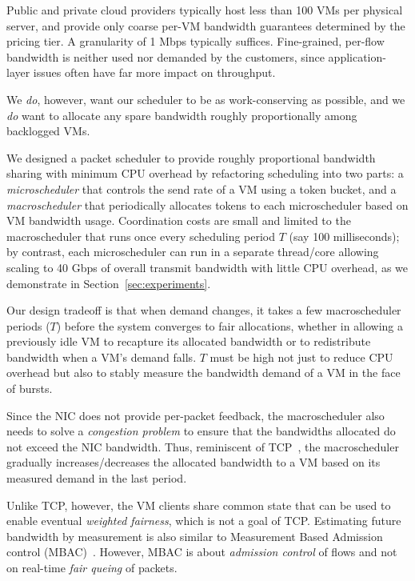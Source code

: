  Public and private cloud providers typically host 
less than 100 VMs per physical server, and provide only coarse per-VM bandwidth guarantees
determined by the pricing tier.  A granularity of 1 Mbps typically suffices.  Fine-grained, per-flow bandwidth is neither
used nor demanded by the customers, since application-layer issues often have
far more impact on throughput.

We {\em do}, however, want our scheduler to be as
work-conserving as possible, and we {\em do} want to allocate any spare
bandwidth roughly proportionally among backlogged VMs.

We designed a packet scheduler to provide roughly proportional bandwidth sharing
with  minimum CPU overhead by refactoring scheduling into two parts: a {\em
microscheduler} that controls the send rate of a VM using a token bucket,
and a {\em macroscheduler} that periodically allocates tokens to each
microscheduler based on VM bandwidth usage.  Coordination costs are small and
limited to the macroscheduler that runs once every scheduling period $T$ (say 100
milliseconds); by contrast, each microscheduler can run in a separate thread/core
allowing scaling to 40 Gbps of overall transmit bandwidth with little CPU
overhead, as we demonstrate in Section~\ref{sec:experiments}.

Our design tradeoff is that when demand changes, it takes a few 
macroscheduler periods ($T$) before the system converges to fair allocations,
whether in allowing a previously idle VM to recapture its allocated bandwidth or
to redistribute bandwidth when a VM's demand falls.  $T$  must be high not just
to reduce CPU overhead but also to stably measure the bandwidth demand of a VM
in the face of bursts.

Since the NIC does not provide per-packet feedback, the macroscheduler also
needs to solve a {\em congestion problem} to ensure that the bandwidths
allocated do not exceed the NIC bandwidth.  Thus, reminiscent of TCP~\cite{tcp},
the macroscheduler gradually increases/decreases the allocated bandwidth to a VM
based on its measured demand in the last period.  

Unlike TCP, however, the VM clients share common state that can be used to
enable eventual {\em weighted fairness}, which is not a goal of TCP.  Estimating
future bandwidth by measurement is also similar to  Measurement Based Admission
control (MBAC)~\cite{mbac}.  However, MBAC is about {\em admission control} of
flows  and not on real-time {\em fair queing} of packets. 

